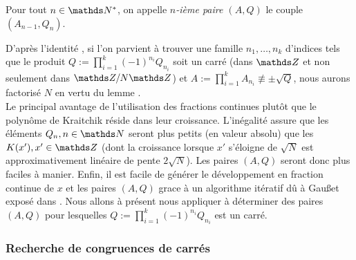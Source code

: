 \begin{definition}
	Pour tout $n\in \N^*$, on appelle \emph{$n$-ième paire $(A, Q)$} le couple
	$(A_{n-1}, Q_n)$.
\end{definition}

D'après l'identité , si l'on parvient à trouver une famille $n_1,
\dots, n_k$ d'indices tels que le produit $Q:=\prod_{i=1}^k (-1)^{n_i} Q_{n_i}$
soit un carré (dans $\Z$ et non seulement dans $\Z/N\Z$) et $A := \prod_{i=1}^k
A_{n_i} \not\equiv \pm\sqrt{Q}$, nous aurons factorisé $N$ en vertu du lemme
. \\

Le principal avantage de l'utilisation des fractions continues plutôt que le
polynôme de Kraitchik réside dans leur croissance. L'inégalité  assure
que les éléments $Q_n, n\in \N$ seront plus petits (en valeur absolu) que les
$K(x'), x'\in \Z$ (dont la croissance lorsque $x'$ s'éloigne de $\sqrt{N}$ est
approximativement linéaire de pente $2\sqrt{N}$). Les paires $(A, Q)$ seront
donc plus faciles à manier. Enfin, il est facile de générer le développement en
fraction continue de $x$ et les paires $(A, Q)$ grace à un algorithme itératif
dû à Gau\ss et exposé dans . Nous allons à présent nous appliquer à
déterminer des paires $(A, Q)$ pour lesquelles $Q:=\prod_{i=1}^k (-1)^{n_i}
Q_{n_i}$ est un carré.

\subsubsection{Recherche de congruences de carrés}
